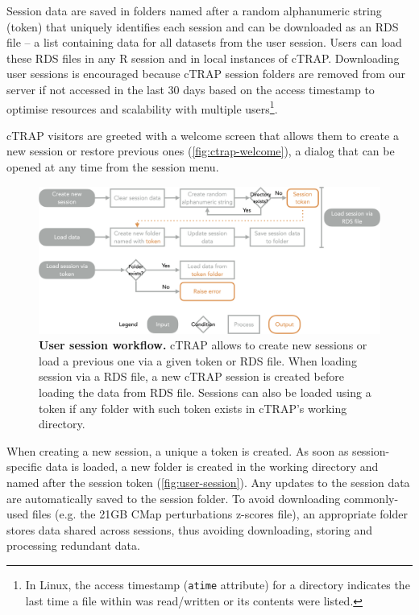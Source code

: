 Session data are saved in folders named after a random alphanumeric string (token) that uniquely identifies each session and can be downloaded as an RDS file -- a list containing data for all datasets from the user session. Users can load these RDS files in any R session and in local instances of cTRAP. Downloading user sessions is encouraged because cTRAP session folders are removed from our server if not accessed in the last 30 days based on the access timestamp to optimise resources and scalability with multiple users\footnote{In Linux, the access timestamp (\texttt{atime} attribute) for a directory indicates the last time a file within was read/written or its contents were listed.}.

cTRAP visitors are greeted with a welcome screen that allows them to create a new session or restore previous ones (\autoref{fig:ctrap-welcome}), a dialog that can be opened at any time from the session menu.

\begin{figure}[!b]
  \includegraphics[width=\textwidth]{images/ctrap/user-session}
  \centering
  \caption[User session workflow]{\textbf{User session workflow.} cTRAP allows to create new sessions or load a previous one via a given token or RDS file. When loading session via a RDS file, a new cTRAP session is created before loading the data from RDS file. Sessions can also be loaded using a token if any folder with such token exists in cTRAP's working directory.}
  \label{fig:user-session}
\end{figure}

When creating a new session, a unique a token is created. As soon as session-specific data is loaded, a new folder is created in the working directory and named after the session token (\autoref{fig:user-session}). Any updates to the session data are automatically saved to the session folder. To avoid downloading commonly-used files (e.g. the 21GB CMap perturbations z-scores file), an appropriate folder stores data shared across sessions, thus avoiding downloading, storing and processing redundant data.

